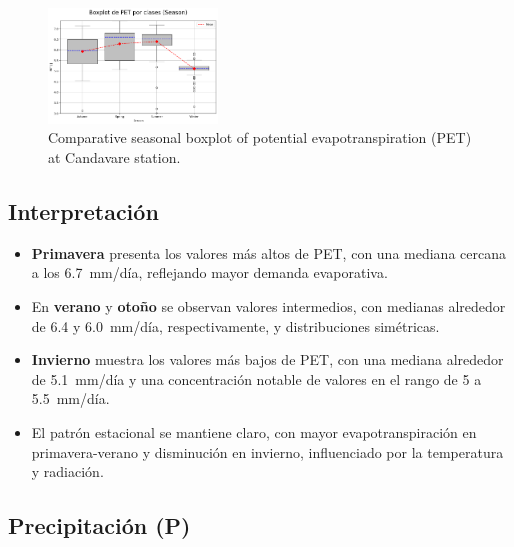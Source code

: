 \vspace{0.2cm}

\begin{figure}[H]
\centering
\includegraphics[width=0.4\textwidth]{resultados/por_estacion_del_anio/boxplot_clases_por_estacion/Candavare/PET_ClassBoxplot_Season.png}
\caption{Comparative seasonal boxplot of potential evapotranspiration (PET) at Candavare station.}
\label{fig:candavare_pet_box}
\end{figure}

\subsection*{Interpretación}

\begin{itemize}
    \item \textbf{Primavera} presenta los valores más altos de PET, con una mediana cercana a los 6.7~mm/día, reflejando mayor demanda evaporativa.
    \item En \textbf{verano} y \textbf{otoño} se observan valores intermedios, con medianas alrededor de 6.4 y 6.0~mm/día, respectivamente, y distribuciones simétricas.
    \item \textbf{Invierno} muestra los valores más bajos de PET, con una mediana alrededor de 5.1~mm/día y una concentración notable de valores en el rango de 5 a 5.5~mm/día.
    \item El patrón estacional se mantiene claro, con mayor evapotranspiración en primavera-verano y disminución en invierno, influenciado por la temperatura y radiación.
\end{itemize}


\subsection{Precipitación (P)}

